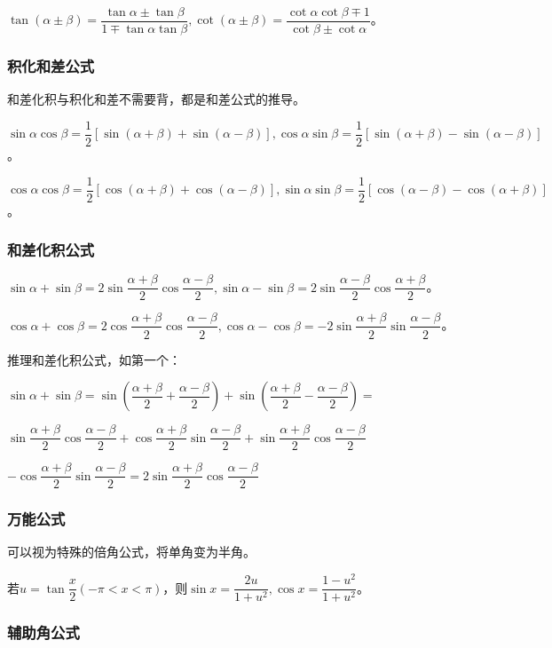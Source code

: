 \documentclass[UTF8, 12pt]{ctexart}
\begin{document}
$\tan(\alpha\pm\beta)=\dfrac{\tan\alpha\pm\tan\beta}{1\mp\tan\alpha\tan\beta},\cot(\alpha\pm\beta)=\dfrac{\cot\alpha\cot\beta\mp 1}{\cot\beta\pm\cot\alpha}$。

\subsubsection{积化和差公式}

和差化积与积化和差不需要背，都是和差公式的推导。

$\sin\alpha\cos\beta=\dfrac{1}{2}[\sin(\alpha+\beta)+\sin(\alpha-\beta)],\cos\alpha\sin\beta=\dfrac{1}{2}[\sin(\alpha+\beta)-\sin(\alpha-\beta)]$。

$\cos\alpha\cos\beta=\dfrac{1}{2}[\cos(\alpha+\beta)+\cos(\alpha-\beta)],\sin\alpha\sin\beta=\dfrac{1}{2}[\cos(\alpha-\beta)-\cos(\alpha+\beta)]$。

\subsubsection{和差化积公式}

$\sin\alpha+\sin\beta=2\sin\dfrac{\alpha+\beta}{2}\cos\dfrac{\alpha-\beta}{2},\sin\alpha-\sin\beta=2\sin\dfrac{\alpha-\beta}{2}\cos\dfrac{\alpha+\beta}{2}$。

$\cos\alpha+\cos\beta=2\cos\dfrac{\alpha+\beta}{2}\cos\dfrac{\alpha-\beta}{2},\cos\alpha-\cos\beta=-2\sin\dfrac{\alpha+\beta}{2}\sin\dfrac{\alpha-\beta}{2}$。

推理和差化积公式，如第一个：

$\sin\alpha+\sin\beta=\sin\left(\dfrac{\alpha+\beta}{2}+\dfrac{\alpha-\beta}{2}\right)+\sin\left(\dfrac{\alpha+\beta}{2}-\dfrac{\alpha-\beta}{2}\right)=$

$\sin\dfrac{\alpha+\beta}{2}\cos\dfrac{\alpha-\beta}{2}+\cos\dfrac{\alpha+\beta}{2}\sin\dfrac{\alpha-\beta}{2}+\sin\dfrac{\alpha+\beta}{2}\cos\dfrac{\alpha-\beta}{2}$

$-\cos\dfrac{\alpha+\beta}{2}\sin\dfrac{\alpha-\beta}{2}=2\sin\dfrac{\alpha+\beta}{2}\cos\dfrac{\alpha-\beta}{2}$

\subsubsection{万能公式}

可以视为特殊的倍角公式，将单角变为半角。

若$u=\tan\dfrac{x}{2}(-\pi<x<\pi)$，则$\sin x=\dfrac{2u}{1+u^2},\cos x=\dfrac{1-u^2}{1+u^2}$。

\subsubsection{辅助角公式}
\end{document}

